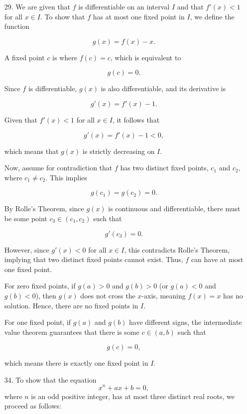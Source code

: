 \documentclass[12pt]{article}
\begin{document}
 
\begin{enumerate}[start=1,label={\bfseries. },leftmargin=1in]

\item [29.]  We are given that \( f \) is differentiable on an interval \( I \) and that \( f'(x) < 1 \) for all \( x \in I \). To show that \( f \) has at most one fixed point in \( I \), we define the function

\[
g(x) = f(x) - x.
\]

A fixed point \( c \) is where \( f(c) = c \), which is equivalent to

\[
g(c) = 0.
\]

Since \( f \) is differentiable, \( g(x) \) is also differentiable, and its derivative is

\[
g'(x) = f'(x) - 1.
\]

Given that \( f'(x) < 1 \) for all \( x \in I \), it follows that

\[
g'(x) = f'(x) - 1 < 0,
\]

which means that \( g(x) \) is strictly decreasing on \( I \).

Now, assume for contradiction that \( f \) has two distinct fixed points, \( c_1 \) and \( c_2 \), where \( c_1 \neq c_2 \). This implies

\[
g(c_1) = g(c_2) = 0.
\]

By Rolle's Theorem, since \( g(x) \) is continuous and differentiable, there must be some point \( c_3 \in (c_1, c_2) \) such that

\[
g'(c_3) = 0.
\]

However, since \( g'(x) < 0 \) for all \( x \in I \), this contradicts Rolle's Theorem, implying that two distinct fixed points cannot exist. Thus, \( f \) can have at most one fixed point.

For zero fixed points, if \( g(a) > 0 \) and \( g(b) > 0 \) (or \( g(a) < 0 \) and \( g(b) < 0 \)), then \( g(x) \) does not cross the \( x \)-axis, meaning \( f(x) = x \) has no solution. Hence, there are no fixed points in \( I \).

For one fixed point, if \( g(a) \) and \( g(b) \) have different signs, the intermediate value theorem guarantees that there is some \( c \in (a, b) \) such that

\[
g(c) = 0,
\]

which means there is exactly one fixed point in \( I \).

\item [34. ]To show that the equation 
    \[
    x^n + ax + b = 0,
    \]
    where \( n \) is an odd positive integer, has at most three distinct real roots, we proceed as follows: 


\end{enumerate}
\end{document}
